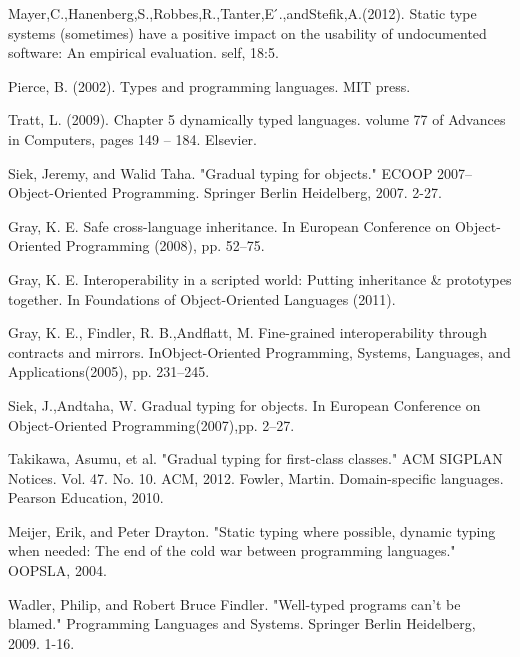 \documentclass[preprint]{sigplanconf}
\begin{document}
\begin{thebibliography}{}
Mayer,C.,Hanenberg,S.,Robbes,R.,Tanter,E ́.,andStefik,A.(2012). Static type systems (sometimes) have a positive impact on the usability of undocumented software: An empirical evaluation. self, 18:5.

Pierce, B. (2002). Types and programming languages. MIT press.

Tratt, L. (2009). Chapter 5 dynamically typed languages. volume 77 of Advances in Computers, pages 149 – 184. Elsevier.

Siek, Jeremy, and Walid Taha. "Gradual typing for objects." ECOOP 2007–Object-Oriented Programming. Springer Berlin Heidelberg, 2007. 2-27.

Gray, K. E. Safe cross-language inheritance. In European Conference on Object-Oriented Programming (2008), pp. 52–75.

Gray, K. E. Interoperability in a scripted world: Putting inheritance \& prototypes together. In Foundations of Object-Oriented Languages (2011).

Gray, K. E., Findler, R. B.,Andflatt, M. Fine-grained interoperability through contracts and mirrors. InObject-Oriented Programming, Systems, Languages, and Applications(2005), pp. 231–245.

Siek, J.,Andtaha, W. Gradual typing for objects. In European Conference on Object-Oriented Programming(2007),pp. 2–27.

Takikawa, Asumu, et al. "Gradual typing for first-class classes." ACM SIGPLAN Notices. Vol. 47. No. 10. ACM, 2012.
Fowler, Martin. Domain-specific languages. Pearson Education, 2010.

Meijer, Erik, and Peter Drayton. "Static typing where possible, dynamic typing when needed: The end of the cold war between programming languages." OOPSLA, 2004.

Wadler, Philip, and Robert Bruce Findler. "Well-typed programs can’t be blamed." Programming Languages and Systems. Springer Berlin Heidelberg, 2009. 1-16.


\end{thebibliography}
\end{document}
